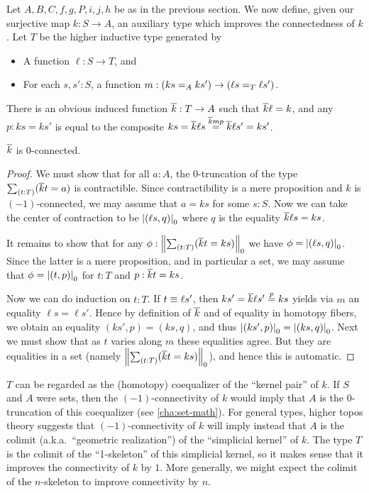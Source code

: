 Let $A,B,C,f,g,P,i,j,h$ be as in the previous section.
We now define, given our surjective map $k:S\to A$, an auxiliary type which improves the connectedness of $k$.
Let $T$ be the higher inductive type generated by
\begin{itemize}
\item A function $\ell:S\to T$, and
\item For each $s,s':S$, a function $m:(\id[A]{ks}{ks'}) \to (\id[T]{\ell s}{\ell s'})$.
\end{itemize}
There is an obvious induced function $\kbar:T\to A$ such that $\kbar \ell = k$, and any $p:ks=ks'$ is equal to the composite $ks = \kbar \ell s \overset{\kbar m p}{=} \kbar \ell s' = k s'$.

\begin{lem}\label{thm:kbar}
  $\kbar$ is 0-connected.
\end{lem}
\begin{proof}
  We must show that for all $a:A$, the 0-truncation of the type $\sm{t:T}(\kbar t = a)$ is contractible.
  Since contractibility is a mere proposition and $k$ is $(-1)$-connected, we may assume that $a=ks$ for some $s:S$.
  Now we can take the center of contraction to be $\tproj0{(\ell s,q)}$ where $q$ is the equality $\kbar\ell s = k s$.

  It remains to show that for any $\phi:\trunc0{\sm{t:T} (\kbar t = ks)}$ we have $\phi = \tproj0{(\ell s,q)}$.
  Since the latter is a mere proposition, and in particular a set, we may assume that $\phi=\tproj0{(t,p)}$ for $t:T$ and $p:\kbar t = ks$.

  Now we can do induction on $t:T$.
  If $t\jdeq\ell s'$, then $ks' = \kbar \ell s' \overset{p}{=} ks$ yields via $m$ an equality $\ell s = \ell s'$.
  Hence by definition of $\kbar$ and of equality in homotopy fibers, we obtain an equality $(ks',p) = (ks,q)$, and thus $\tproj0{(ks',p)} = \tproj0{(ks,q)}$.
  Next we must show that as $t$ varies along $m$ these equalities agree.
  But they are equalities in a set (namely $\trunc0{\sm{t:T} (\kbar t = ks)}$), and hence this is automatic.
\end{proof}

\begin{rmk}
  $T$ can be regarded as the (homotopy) coequalizer of the ``kernel pair'' of $k$.
  If $S$ and $A$ were sets, then the $(-1)$-connectivity of $k$ would imply that $A$ is the $0$-truncation of this coequalizer (see \cref{cha:set-math}).
  For general types, higher topos theory suggests that $(-1)$-con\-nec\-tiv\-i\-ty of $k$ will imply instead that $A$ is the colimit (a.k.a.\ ``geometric realization'') of the ``simplicial kernel'' of $k$.
  The type $T$ is the colimit of the ``1-skeleton'' of this simplicial kernel, so it makes sense that it improves the connectivity of $k$ by $1$.
  More generally, we might expect the colimit of the $n$-skeleton to improve connectivity by $n$.
\end{rmk}

